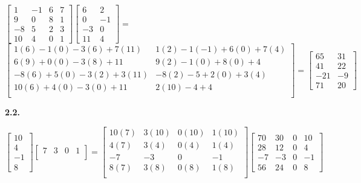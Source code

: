 \documentclass[12pt]{article}
\begin{document}
\begin{center}

$
\begin{bmatrix}
1 & -1 & 6 & 7\\
9 & 0 & 8 & 1\\
-8 & 5 & 2 & 3\\
10 & 4 & 0 & 1
\end{bmatrix}
\begin{bmatrix}
6 & 2\\
0 & -1\\
-3 & 0\\
11 & 4
\end{bmatrix}=$\\
\bigskip
$
\begin{bmatrix}
1(6)-1(0)-3(6)+7(11) & 1(2)-1(-1)+6(0)+7(4)\\
6(9)+0(0)-3(8)+11 & 9(2)-1(0)+8(0)+4\\
-8(6)+5(0)-3(2)+3(11) & -8(2)-5+2(0)+3(4)\\
10(6)+4(0)-3(0)+11 & 2(10)-4+4\\
\end{bmatrix}=
\begin{bmatrix}
65 & 31\\
41 & 22\\
-21 & -9\\
71 & 20
\end{bmatrix}
$\\

\end{center}

{\bf 2.2.} 
\begin{center}
$
\begin{bmatrix}
10\\
4\\
-1\\
8
\end{bmatrix}
\begin{bmatrix}
7 & 3 & 0 & 1\\
\end{bmatrix}=
\begin{bmatrix}
10(7) & 3(10) & 0(10) & 1(10)\\
4(7) & 3(4) & 0(4) & 1(4)\\
-7 & -3 & 0 & -1\\
8(7) & 3(8) & 0(8) & 1(8)\\
\end{bmatrix}
\begin{bmatrix}
70 & 30 & 0 & 10\\
28 & 12 & 0 & 4\\
-7 & -3 & 0 & -1\\
56 & 24 & 0 & 8
\end{bmatrix}
$

\end{center}
\end{document}
